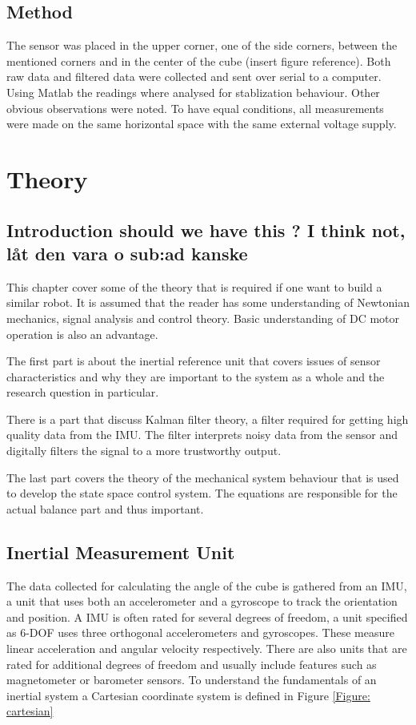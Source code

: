 \documentclass[a4paper,11pt]{kth-mag}
\begin{document}
\section{Method}
The sensor was placed in the upper corner, one of the side corners, between the mentioned corners and in the center of the cube (insert figure reference). Both raw data and filtered data were collected and sent over serial to a computer. Using Matlab \cite{MATLAB:2014} the readings where analysed for stablization behaviour. Other obvious observations were noted. To have equal conditions, all measurements were made on the same horizontal space with the same external voltage supply.

\chapter{Theory}
\section{Introduction should we have this ? I think not, låt den vara o sub:ad kanske}
This chapter cover some of the theory that is required if one want to build a similar robot. It is assumed that the reader has some understanding of Newtonian mechanics, signal analysis and control theory. Basic understanding of DC motor operation is also an advantage.

The first part is about the inertial reference unit that covers issues of sensor characteristics and why they are important to the system as a whole and the research question in particular.

There is a part that discuss Kalman filter theory, a filter required for getting high quality data from the IMU. The filter interprets noisy data from the sensor and digitally filters the signal to a more trustworthy output. 

The last part covers the theory of the mechanical system behaviour that is used to develop the state space control system. The equations are responsible for the actual balance part and thus important. 



\section{Inertial Measurement Unit} \label{section:IMU}
The data collected for calculating the angle of the cube is gathered from an IMU, a unit that uses both an accelerometer and a gyroscope to track the orientation and position. A IMU is often rated for several degrees of freedom, a unit specified as 6-DOF uses three orthogonal accelerometers and gyroscopes. These measure linear acceleration and angular velocity respectively. There are also units that are rated for additional degrees of freedom and usually include features such as magnetometer or barometer sensors.   
To understand the fundamentals of an inertial system a Cartesian coordinate system is defined in Figure \ref{Figure: cartesian}
\end{document}
